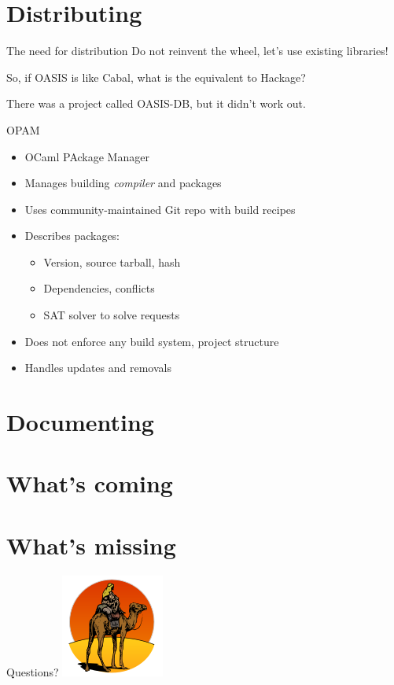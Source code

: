 \documentclass{beamer}
\begin{document}
\section{Distributing}

\begin{frame}{The need for distribution}
  Do not reinvent the wheel, let's use existing libraries!

  So, if OASIS is like Cabal, what is the equivalent to Hackage? \pause

  There was a project called OASIS-DB, but it didn't work out.
\end{frame}

\begin{frame}{OPAM}
  \begin{itemize}
    \item OCaml PAckage Manager
    \item Manages building \emph{compiler} and packages
    \item Uses community-maintained Git repo with build recipes
    \item Describes packages:
      \begin{itemize}
        \item Version, source tarball, hash
        \item Dependencies, conflicts
        \item SAT solver to solve requests
      \end{itemize}
    \item Does not enforce any build system, project structure
    \item Handles updates and removals
  \end{itemize}
\end{frame}

\section{Documenting}

\section{What's coming}

\section{What's missing}

\begin{frame}{Questions?}
  \centering
  \includegraphics[height=.85\textheight]{camel}
\end{frame}
\end{document}
